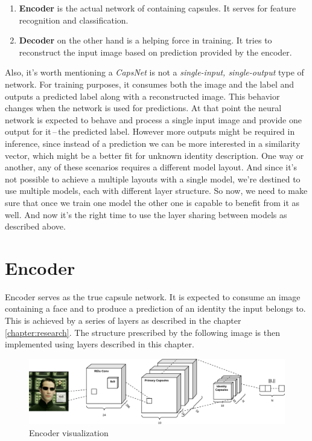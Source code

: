 \begin{enumerate}
    \item \textbf{Encoder} is the actual network of containing capsules. It serves for feature recognition and classification.
    \item \textbf{Decoder} on the other hand is a helping force in training. It tries to reconstruct the input image based on prediction provided by the encoder.
\end{enumerate}

Also, it's worth mentioning a \textit{CapsNet} is not a \textit{single-input, single-output} type of network. For training purposes, it consumes both the image and the label and outputs a predicted label along with a reconstructed image. This behavior changes when the network is used for predictions. At that point the neural network is expected to behave and process a single input image and provide one output for it\,--\,the predicted label. However more outputs might be required in inference, since instead of a prediction we can be more interested in a similarity vector, which might be a better fit for unknown identity description. One way or another, any of these scenarios requires a different model layout. And since it's not possible to achieve a multiple layouts with a single model, we're destined to use multiple models, each with different layer structure. So now, we need to make sure that once we train one model the other one is capable to benefit from it as well. And now it's the right time to use the layer sharing between models as described above.

\section{Encoder}

Encoder serves as the true capsule network. It is expected to consume an image containing a face and to produce a prediction of an identity the input belongs to. This is achieved by a series of layers as described in the chapter \ref{chapter:research}. The structure prescribed by the following image is then implemented using layers described in this chapter.

\begin{figure}[ht!]
    \centering
    \includegraphics[width=\textwidth]{obrazky-figures/my_capsnet_encoder.pdf}
    \caption{Encoder visualization}
    \label{fig:my_encoder}
\end{figure}

